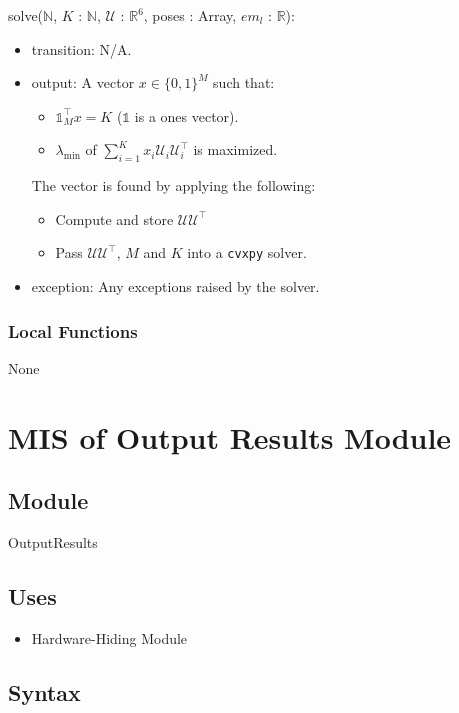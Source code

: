 \documentclass[12pt, titlepage]{article}
\begin{document}
\noindent solve($\mathbb{N}$, $K$ : $\mathbb{N}$, $\mathcal{U}$ : $\mathbb{R}^{6}$, poses : Array, $em_l$ : $\mathbb{R}$):
\begin{itemize}
\item transition: N/A.
\item output: A vector $x \in \{ 0, 1 \}^M$ such that:
\begin{itemize}
  \item $\mathds{1}_M^\top x = K$ ($\mathds{1}$ is a ones vector).
  \item $\lambda_{\text{min}}$ of $\sum^K_{i=1} x_i \mathcal{U}_i \mathcal{U}_i^\top$ is maximized. 
\end{itemize}
The vector is found by applying the following:
\begin{itemize}
  \item Compute and store $\mathcal{U} \mathcal{U}^\top$ 
  \item Pass $\mathcal{U} \mathcal{U}^\top$, $M$ and $K$ into a \texttt{cvxpy} solver.
\end{itemize}
\item exception: Any exceptions raised by the solver.  
\end{itemize}

\subsubsection{Local Functions}
None

\newpage

\section{MIS of Output Results Module} \label{MISResults}

\subsection{Module}
OutputResults 

\subsection{Uses}
\begin{itemize}
  \item Hardware-Hiding Module
\end{itemize}

\subsection{Syntax}
\end{document}
